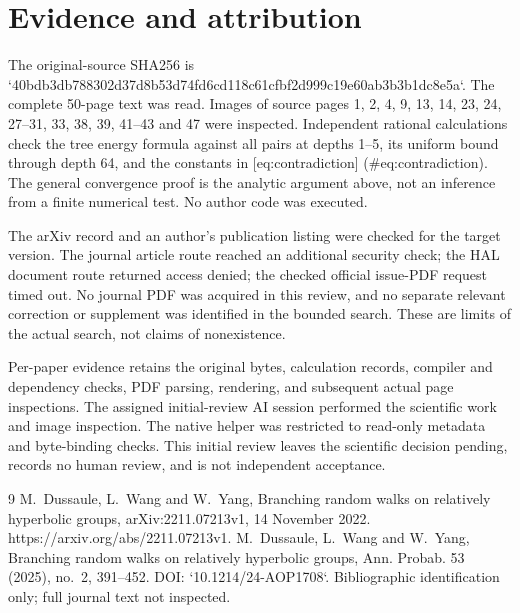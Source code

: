 \documentclass[10pt]{article}
\begin{document}
\section*{Evidence and attribution}
The original-source SHA256 is `40bdb3db788302d37d8b53d74fd6cd118c61cfbf2d999c19e60ab3b3b1dc8e5a`. The complete 50-page text was read. Images of source pages 1, 2, 4, 9, 13, 14, 23, 24, 27–31, 33, 38, 39, 41–43 and 47 were inspected. Independent rational calculations check the tree energy formula against all pairs at depths 1–5, its uniform bound through depth 64, and the constants in [eq:contradiction] (\#eq:contradiction). The general convergence proof is the analytic argument above, not an inference from a finite numerical test. No author code was executed.\par
The arXiv record and an author’s publication listing were checked for the target version. The journal article route reached an additional security check; the HAL document route returned access denied; the checked official issue-PDF request timed out. No journal PDF was acquired in this review, and no separate relevant correction or supplement was identified in the bounded search. These are limits of the actual search, not claims of nonexistence.\par
Per-paper evidence retains the original bytes, calculation records, compiler and dependency checks, PDF parsing, rendering, and subsequent actual page inspections. The assigned initial-review AI session performed the scientific work and image inspection. The native helper was restricted to read-only metadata and byte-binding checks. This initial review leaves the scientific decision pending, records no human review, and is not independent acceptance.\par
9 M. Dussaule, L. Wang and W. Yang, Branching random walks on relatively hyperbolic groups, arXiv:2211.07213v1, 14 November 2022. https://arxiv.org/abs/2211.07213v1. M. Dussaule, L. Wang and W. Yang, Branching random walks on relatively hyperbolic groups, Ann. Probab. 53 (2025), no. 2, 391–452. DOI: `10.1214/24-AOP1708`. Bibliographic identification only; full journal text not inspected.\par
\end{document}
